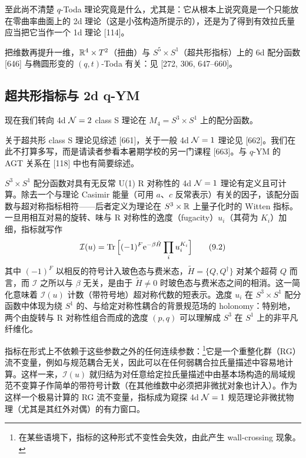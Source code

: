 
至此尚不清楚 $q$-Toda 理论究竟是什么，尤其是：它从根本上说究竟是一个只能放在零曲率曲面上的 2d 理论（这是小弦构造所提示的），还是为了得到有效拉氏量应当把它当作一个 1d 理论 [114]。

把维数再提升一维，$\mathbb{R}^4\times T^2$（扭曲）与 $S^5\times S^1$（超共形指标）上的 6d 配分函数 [646] 与椭圆形变的 $(q,t)$-Toda 有关：见 [272, 306, 647--660]。

\subsection{超共形指标与 2d q-YM}

现在我们转向 4d $\mathcal{N}=2$ class S 理论在 $M_4=S^3\times S^1$ 上的配分函数。

关于超共形 class S 理论见综述 [661]，关于一般 4d $\mathcal{N}=1$ 理论见 [662]。我们在此不打算多写，而是请读者参看本暑期学校的另一门课程 [663]。与 $q$-YM 的 AGT 关系在 [118] 中也有简要综述。

$S^3\times S^1$ 配分函数对具有无反常 U(1) R 对称性的 4d $\mathcal{N}=1$ 理论有定义且可计算。除去一个与理论 Casimir 能量（可用 $a$、$c$ 反常表示）有关的因子，该配分函数与超对称指标相符------后者定义为理论在 $S^3\times\mathbb{R}$ 上量子化时的 Witten 指标。一旦用相互对易的旋转、味与 R 对称性的逸度（fugacity）$u_i$（其荷为 $K_i$）加细，指标就写作
\begin{equation}
\mathcal{I}(u)=\operatorname{Tr}\Big[(-1)^F\mathrm{e}^{-\beta\tilde H}\prod_i u_i^{K_i}\Big]
\tag{9.2}
\end{equation}
其中 $(-1)^F$ 以相反的符号计入玻色态与费米态，$\tilde H=\{Q,Q^\dagger\}$ 对某个超荷 $Q$ 而言，而 $\mathcal I$ 之所以与 $\beta$ 无关，是由于 $\tilde H\neq 0$ 时玻色态与费米态之间的相消。这一简化意味着 $\mathcal I(u)$ 计数（带符号地）超对称代数的短表示。逸度 $u_i$ 在 $S^3\times S^1$ 配分函数中体现为绕 $S^1$ 的、与给定对称性耦合的背景规范场的 holonomy：特别地，两个由旋转与 R 对称性组合而成的逸度 $(p,q)$ 可以理解成 $S^3$ 在 $S^1$ 上的非平凡纤维化。

指标在形式上不依赖于这些参数之外的任何连续参数：\footnote{在某些语境下，指标的这种形式不变性会失效，由此产生 wall-crossing 现象。}它是一个重整化群（RG）流不变量，例如与规范耦合无关，因此可以在任何弱耦合拉氏量描述中容易地计算。这样一来，$\mathcal I(u)$ 就归结为对任意给定拉氏量描述中由基本场构造的局域规范不变算子作简单的带符号计数（在其他维数中必须把非微扰对象也计入）。作为这样一个极易计算的 RG 流不变量，指标成为窥探 4d $\mathcal{N}=1$ 规范理论非微扰物理（尤其是其红外对偶）的有力窗口。

